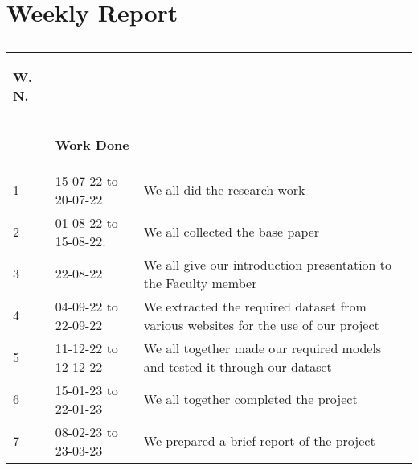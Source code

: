 \chapter{Weekly Report}
\section*{\centering{\huge }}
	\begin{tabular}{|p{1cm}|p{6cm}|p{8cm}|}
			\hline
			\begin{center}
				\textbf{W. N.}
			\end{center} &\begin{center}
				 \textbf{Week Dates}\\ 
			\end{center} & \begin{center}
				\textbf{Work Done}
			\end{center} \\ 
			\hline
			1 & 15-07-22 to 20-07-22
    & We all did the research work \\
    \hline
			2 & 01-08-22 to 15-08-22. &  We all collected the base paper\\
   \hline
			3 & 22-08-22  & We all give our introduction presentation to the Faculty member\\
   \hline
			4 & 04-09-22
to 22-09-22

 & We extracted the required dataset from various websites for the use of our project\\ 
 \hline
			5 & 11-12-22 to 12-12-22
  & We all together made our required models and tested it through our dataset\\
  \hline
			6 & 15-01-23 to 22-01-23
 & We all together completed the project
\\
\hline
			7 & 08-02-23 to 23-03-23 & We prepared a brief report of the project\\  \hline
		\end{tabular}
\\ 